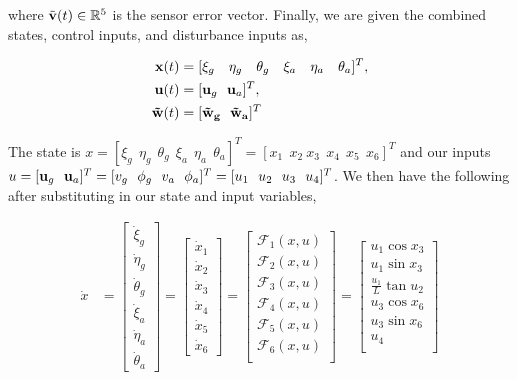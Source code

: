 \documentclass[paper=a4, fontsize=11pt]{scrartcl} %
\numberwithin{equation}{section} %
\numberwithin{figure}{section} %
\numberwithin{table}{section} %
\begin{document}
\begin{framed}
where $\Tilde{\bold{v}}(t) \in \mathbb{R}^5$ is the sensor error vector.  Finally, we are given the combined states, control inputs, and disturbance inputs as,

\begin{align*}
    \bold{x}(t) &= [ \xi_g \ \ \ \eta_g \ \ \ \theta_g \ \ \ \xi_a \ \ \ \eta_a \ \ \ \theta_a ] ^T ,\\
    \bold{u}(t) &= [ \bold{u}_g \ \ \bold{u}_a ]^T ,\\
    \bold{\Tilde{w}}(t) &= [\bold{\Tilde{w}_g \ \ \bold{\Tilde{w}}_a}]^T \\
\end{align*}

The state is $x = [\xi_g \ \  \eta_g \ \  \theta_g \ \  \xi_a \ \  \eta_a \ \ \theta_a ]^T = [ x_1 \ \ x_2 \  x_3 \ \ x_4 \ \ x_5 \ \ x_6 ]^T$ and our inputs $u = [ \bold{u}_g \ \ \bold{u}_a ]^T = [v_g \ \ \phi_g \ \ v_a \ \ \phi_a]^T = [u_1 \ \ u_2 \ \ u_3 \ \ u_4 ]^T$.  We then have the following after substituting in our state and input variables,

\begin{align*}
    \dot{x} &= \begin{bmatrix}
           \dot{\xi}_g \\
           \dot{\eta}_g \\
           \dot{\theta}_g \\
           \dot{\xi}_a \\
           \dot{\eta}_a \\
           \dot{\theta}_a
         \end{bmatrix} 
         =  \begin{bmatrix}
           \dot{x}_1 \\
           \dot{x}_2 \\
           \dot{x}_3 \\
           \dot{x}_4 \\
           \dot{x}_5 \\
           \dot{x}_6
         \end{bmatrix} 
         = \begin{bmatrix}
           \mathcal{F}_1(x,u) \\
           \mathcal{F}_2(x,u) \\
           \mathcal{F}_3(x,u) \\
           \mathcal{F}_4(x,u) \\
           \mathcal{F}_5(x,u) \\
           \mathcal{F}_6(x,u) \\
         \end{bmatrix}
         = \begin{bmatrix}
           u_1 \cos{x_3} \\
           u_1 \sin{x_3} \\
           \frac{u_1}{L} \tan{u_2} \\
           u_3 \cos{x_6} \\
           u_3 \sin{x_6} \\
           u_4 \\
         \end{bmatrix} 
\end{align*}



\end{framed}
\end{document}
